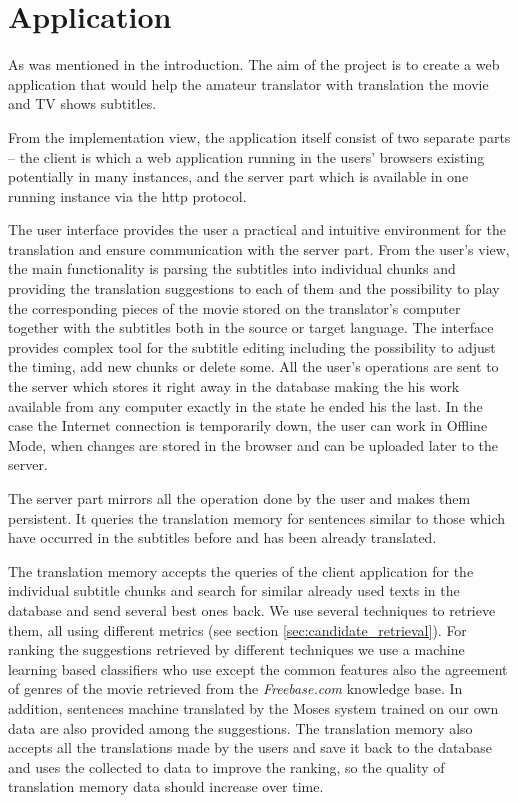 \section{Application}

As was mentioned in the introduction. The aim of the project is to create a web application that would help the amateur translator with translation the movie and TV shows subtitles.

From the implementation view, the application itself consist of two separate parts -- the client is which a web application running in the users' browsers existing potentially in many instances, and the server part which is available in one running instance via the http protocol.

The user interface provides the user a practical and intuitive environment for the translation and ensure communication with the server part. From the user's view, the main functionality is parsing the subtitles into individual chunks and providing the translation suggestions to each of them and the possibility to play the corresponding pieces of the movie stored on the translator's computer together with the subtitles both in the source or target language. The interface provides complex tool for the subtitle editing including the possibility to adjust the timing, add new chunks or delete some. All the user's operations are sent to the server which stores it right away in the database making the his work available from any computer exactly in the state he ended his the last. In the case the Internet connection is temporarily down, the user can work in Offline Mode, when changes are stored in the browser and can be uploaded later to the server.

The server part mirrors all the operation done by the user and makes them persistent. It queries the translation memory for sentences similar to those which have occurred in the subtitles before and has been already translated. 

The translation memory accepts the queries of the client application for the individual subtitle chunks and search for similar already used texts in the database and send several best ones back. We use several techniques to retrieve them, all using different metrics (see section \ref{sec:candidate_retrieval}). For ranking the suggestions retrieved by different techniques we use a machine learning based classifiers who use except the common features also the agreement of genres of the movie retrieved from the {\it Freebase.com} knowledge base. In addition, sentences machine translated by the Moses system trained on our own data are also provided among the suggestions. The translation memory also accepts all the translations made by the users and save it back to the database and uses the collected to data to improve the ranking, so the quality of translation memory data should increase over time.

